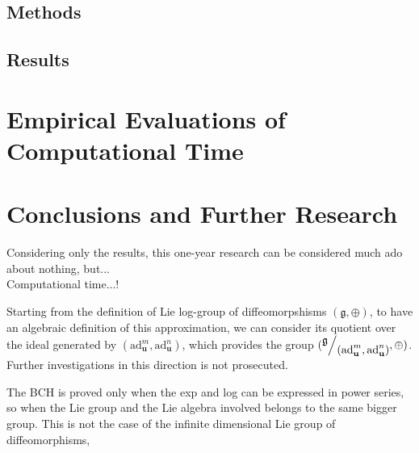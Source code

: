 \subsection{Methods}

\subsection{Results}


\section{Empirical Evaluations of Computational Time}


\section{Conclusions and Further Research}\label{ch:conclusions}


Considering only the results, this one-year research can be considered much ado about nothing, but...\\
Computational time...!

Starting from the definition of Lie log-group of diffeomorpshisms $(\mathfrak{g} , \oplus)$, to have an algebraic definition of this approximation, we can consider its quotient over the ideal generated by $(\text{ad}_{\mathbf{u}}^{m}, \text{ad}_{\mathbf{u}}^{n})$, which provides the group $(\quotient{\mathfrak{g}}{(\text{ad}_{\mathbf{u}}^{m}, \text{ad}_{\mathbf{u}}^{n})}, \oplus)$. Further investigations in this direction is not prosecuted.


The BCH is proved only when the exp and log can be expressed in power series, so when the Lie group and the Lie algebra involved belongs to the same bigger group. This is not the case of the infinite dimensional Lie group of diffeomorphisms,